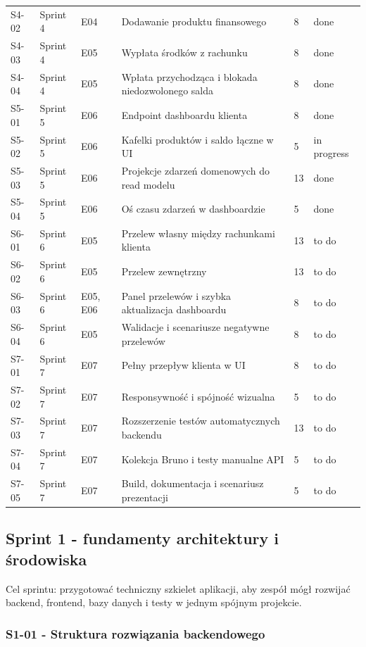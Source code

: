 \documentclass[12pt,a4paper]{article}
\begin{document}
\begin{longtable}{@{}L{0.08\textwidth}L{0.12\textwidth}L{0.10\textwidth}L{0.42\textwidth}C{0.06\textwidth}L{0.12\textwidth}@{}}
S4-02 & Sprint 4 & E04 & Dodawanie produktu finansowego & 8 & done \\
S4-03 & Sprint 4 & E05 & Wypłata środków z rachunku & 8 & done \\
S4-04 & Sprint 4 & E05 & Wpłata przychodząca i blokada niedozwolonego salda & 8 & done \\
S5-01 & Sprint 5 & E06 & Endpoint dashboardu klienta & 8 & done \\
S5-02 & Sprint 5 & E06 & Kafelki produktów i saldo łączne w UI & 5 & in progress \\
S5-03 & Sprint 5 & E06 & Projekcje zdarzeń domenowych do read modelu & 13 & done \\
S5-04 & Sprint 5 & E06 & Oś czasu zdarzeń w dashboardzie & 5 & done \\
S6-01 & Sprint 6 & E05 & Przelew własny między rachunkami klienta & 13 & to do \\
S6-02 & Sprint 6 & E05 & Przelew zewnętrzny & 13 & to do \\
S6-03 & Sprint 6 & E05, E06 & Panel przelewów i szybka aktualizacja dashboardu & 8 & to do \\
S6-04 & Sprint 6 & E05 & Walidacje i scenariusze negatywne przelewów & 8 & to do \\
S7-01 & Sprint 7 & E07 & Pełny przepływ klienta w UI & 8 & to do \\
S7-02 & Sprint 7 & E07 & Responsywność i spójność wizualna & 5 & to do \\
S7-03 & Sprint 7 & E07 & Rozszerzenie testów automatycznych backendu & 13 & to do \\
S7-04 & Sprint 7 & E07 & Kolekcja Bruno i testy manualne API & 5 & to do \\
S7-05 & Sprint 7 & E07 & Build, dokumentacja i scenariusz prezentacji & 5 & to do \\
\bottomrule
\end{longtable}
\endgroup

\subsection*{Sprint 1 - fundamenty architektury i środowiska}

Cel sprintu: przygotować techniczny szkielet aplikacji, aby zespół mógł rozwijać backend, frontend, bazy danych i testy w jednym spójnym projekcie.

\subsubsection*{S1-01 - Struktura rozwiązania backendowego}
\end{document}

